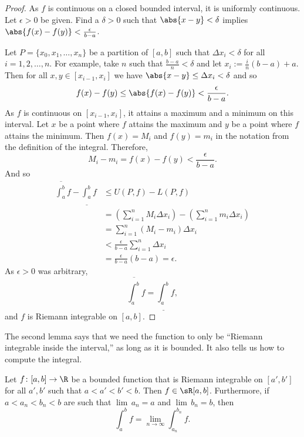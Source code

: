 \documentclass[12pt]{book}
\begin{document}
\begin{proof}
As $f$ is continuous on a closed bounded interval, it is
uniformly continuous.
Let $\epsilon > 0$ be given.
Find a $\delta > 0$ such that
$\abs{x-y} < \delta$ implies $\abs{f(x)-f(y)} < \frac{\epsilon}{b-a}$.

Let $P = \{ x_0, x_1, \ldots, x_n \}$
be a partition of $[a,b]$ such that $\Delta x_i < \delta$ for all $i = 1,2,
\ldots, n$.
For example,
take $n$ such that $\frac{b-a}{n} < \delta$ and
let $x_i := \frac{i}{n}(b-a) + a$.
Then for all $x, y \in [x_{i-1},x_i]$ we have 
$\abs{x-y} \leq \Delta x_i < \delta$ and so
\begin{equation*}
f(x)-f(y) \leq \abs{f(x)-f(y)} < \frac{\epsilon}{b-a} .
\end{equation*}
As $f$ is continuous on $[x_{i-1},x_i]$, it attains a maximum and a minimum
on this interval.
Let $x$ be a point where $f$ attains the maximum and $y$ be a point
where $f$ attains the minimum.
Then $f(x) = M_i$
and $f(y) = m_i$ in the notation from the definition of the integral.
Therefore,
\begin{equation*}
M_i-m_i = f(x)-f(y) < 
\frac{\epsilon}{b-a} .
\end{equation*}
And so
\begin{equation*}
\begin{split}
\overline{\int_a^b} f - 
\underline{\int_a^b} f 
& \leq
U(P,f) - L(P,f)
\\
& =
\left(
\sum_{i=1}^n
M_i \Delta x_i
\right)
-
\left(
\sum_{i=1}^n
m_i \Delta x_i
\right)
\\
& =
\sum_{i=1}^n
(M_i-m_i) \Delta x_i
\\
& <
\frac{\epsilon}{b-a}
\sum_{i=1}^n
\Delta x_i
\\
& =
\frac{\epsilon}{b-a} (b-a)
= \epsilon .
\end{split}
\end{equation*}
As $\epsilon > 0$ was arbitrary,
\begin{equation*}
\overline{\int_a^b} f = \underline{\int_a^b} f ,
\end{equation*}
and $f$ is Riemann integrable on $[a,b]$.
\end{proof}

The second lemma says that we need the function to only be ``Riemann integrable
inside the interval,'' as long as it is bounded.
It also tells us how to
compute the integral.

\begin{lemma} \label{lemma:boundedimpriemann}
Let $f \colon [a,b] \to \R$ be a bounded function that is Riemann
integrable on $[a',b']$ for all $a',b'$ such that $a < a' < b' < b$.
Then $f \in \sR[a,b]$.
Furthermore, if $a < a_n < b_n < b$ are such that
$\lim \, a_n = a$ and $\lim \, b_n = b$, then
\begin{equation*}
\int_a^b f = 
\lim_{n \to \infty} \int_{a_n}^{b_n} f .
\end{equation*}
\end{lemma}
\end{document}
